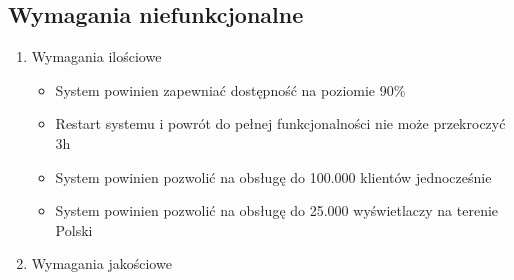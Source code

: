 \documentclass[10pt,a4paper,titlepage]{article} %
\begin{document}
		\subsection{Wymagania niefunkcjonalne}
		   \begin{enumerate}
		     
		     \item Wymagania ilościowe
		     
		     	\begin{itemize}
		     	  \item System powinien zapewniać dostępność na poziomie 90\%
		     	  \item Restart systemu i powrót do pełnej funkcjonalności nie może
		     przekroczyć 3h
		     	  \item System powinien pozwolić na obsługę do 100.000 klientów
		     	  jednocześnie
		     	  \item System powinien pozwolić na obsługę do 25.000 wyświetlaczy na
		     terenie Polski
		     	\end{itemize}
		     	
		     \item Wymagania jakościowe
				

\end{enumerate}
\end{document}
